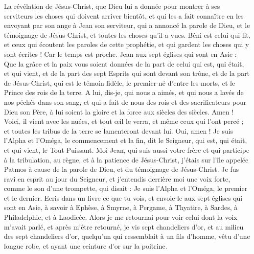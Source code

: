 \begin{multicols}{2}
\VerseOne{}La révélation de Jésus-Christ, que Dieu lui a donnée pour montrer à ses serviteurs les choses qui doivent arriver bientôt, et qui les a fait connaître en les envoyant par son ange à Jean son serviteur,
qui a annoncé la parole de Dieu, et le témoignage de Jésus-Christ, et toutes les choses qu'il a vues.
Béni est celui qui lit, et ceux qui écoutent les paroles de cette prophétie, et qui gardent les choses qui y sont écrites ! Car le temps est proche.
Jean aux sept églises qui sont en Asie : Que la grâce et la paix vous soient données de la part de celui qui est, qui était, et qui vient, et de la part des sept Esprits qui sont devant son trône,
et de la part de Jésus-Christ, qui est le témoin fidèle, le premier-né d'entre les morts, et le Prince des rois de la terre.
A lui, dis-je, qui nous a aimés, et qui nous a lavés de nos péchés dans son sang, et qui a fait de nous des rois et des sacrificateurs pour Dieu son Père, à lui soient la gloire et la force aux siècles des siècles. Amen !
Voici, il vient avec les nuées, et tout œil le verra, et même ceux qui l'ont percé ; et toutes les tribus de la terre se lamenteront devant lui. Oui, amen !
Je suis l'Alpha et l'Oméga, le commencement et la fin, dit le Seigneur, qui est, qui était, et qui vient, le Tout-Puissant.
Moi Jean, qui suis aussi votre frère et qui participe à la tribulation, au règne, et à la patience de Jésus-Christ, j'étais sur l'île appelée Patmos à cause de la parole de Dieu, et du témoignage de Jésus-Christ.
Je fus ravi en esprit au jour du Seigneur, et j'entendis derrière moi une voix forte, comme le son d'une trompette,
qui disait : Je suis l'Alpha et l'Oméga, le premier et le dernier. Ecris dans un livre ce que tu vois, et envoie-le aux sept églises qui sont en Asie, à savoir à Ephèse, à Smyrne, à Pergame, à Thyatire, à Sardes, à Philadelphie, et à Laodicée.
Alors je me retournai pour voir celui dont la voix m'avait parlé, et après m'être retourné, je vis sept chandeliers d'or,
et au milieu des sept chandeliers d'or, quelqu'un qui ressemblait à un fils d'homme, vêtu d'une longue robe, et ayant une ceinture d'or sur la poitrine.

\end{multicols}
